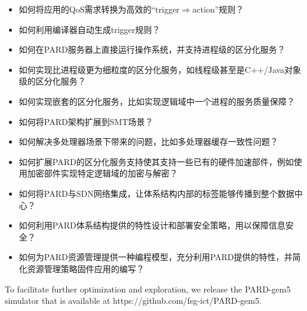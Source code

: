 \begin{itemize}
  \item 如何将应用的QoS需求转换为高效的``trigger$\Rightarrow$action''规则？
  \item 如何利用编译器自动生成trigger规则？
  \item 如何在PARD服务器上直接运行操作系统，并支持进程级的区分化服务？
  \item 如何实现比进程级更为细粒度的区分化服务，如线程级甚至是C++/Java对象级的区分化服务？
  \item 如何实现嵌套的区分化服务，比如实现逻辑域中一个进程的服务质量保障？
  \item 如何将PARD架构扩展到SMT场景？
  \item 如何解决多处理器场景下带来的问题，比如多处理器缓存一致性问题？
  \item 如何扩展PARD的区分化服务支持使其支持一些已有的硬件加速部件，例如使用加密部件实现特定逻辑域的加密与解密？
  \item 如何将PARD与SDN网络集成，让体系结构内部的标签能够传播到整个数据中心？
  \item 如何利用PARD体系结构提供的特性设计和部署安全策略，用以保障信息安全？
  \item 如何为PARD资源管理提供一种编程模型，充分利用PARD提供的特性，并简化资源管理策略固件应用的编写？
\end{itemize}

To facilitate further optimization and exploration, we
release the PARD-gem5 simulator that is available at
https://github.com/fsg-ict/PARD-gem5.

